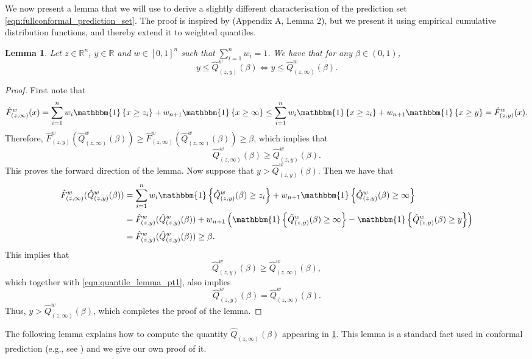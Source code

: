 \documentclass[11pt, titlepage]{article} %
\newcommand{\Ind}[1]{\mathbbm{1}\left\{ #1 \right\}}
\numberwithin{equation}{section}
\newtheorem{lemma}{Lemma}
\theoremstyle{definition}
\numberwithin{theorem}{section}
\numberwithin{lemma}{section}
\numberwithin{corollary}{section}
\numberwithin{proposition}{section}
\numberwithin{definition}{section}
\numberwithin{remark}{section}
\begin{document}
\noindent
We now present a lemma that we will use to derive a slightly different characterisation of the prediction set \eqref{eqn:fullconformal_prediction_set}. The proof is inspired by \cite{romano2019_CQR} (Appendix A, Lemma 2), but we present it using empirical cumulative distribution functions, and thereby extend it to weighted quantiles.

\begin{lemma}
    Let \(z \in \mathbb{R}^n\), \(y \in \mathbb{R}\) and \(w \in [0,1]^n\) such that \(\sum_{i=1}^n w_i = 1\). We have that for any \(\beta \in (0,1)\), \[y \leq \hat{Q}^w_{(z,y)}(\beta) \iff y \leq \hat{Q}^w_{(z,\infty)}(\beta).\]
\label{lemma:quantile_lemma}
\end{lemma}
\begin{proof}
    First note that \[
        \hat{F}^w_{(z,\infty)}(x) = \sum_{i=1}^n w_i \Ind{x \geq z_i} + w_{n+1} \Ind{x \geq \infty} \leq \sum_{i=1}^n w_i \Ind{x \geq z_i} + w_{n+1} \Ind{x \geq y} = \hat{F}^w_{(z,y)}(x).
    \] Therefore, \(\hat{F}^w_{(z,y)}(\hat{Q}^w_{(z, \infty)}(\beta)) \geq \hat{F}^w_{(z,\infty)}(\hat{Q}^w_{(z, \infty)}(\beta)) \geq \beta\), which implies that \begin{equation}
        \hat{Q}^w_{(z, \infty)}(\beta) \geq \hat{Q}^w_{(z, y)}(\beta).
    \label{eqn:quantile_lemma_pt1}
    \end{equation} This proves the forward direction of the lemma. Now suppose that \(y > \hat{Q}^w_{(z,y)}(\beta).\) Then we have that \begin{align*}
        \hat{F}^w_{(z,\infty)}(\hat{Q}^w_{(z, y)}(\beta)) &= \sum_{i=1}^n w_i \Ind{\hat{Q}^w_{(z, y)}(\beta) \geq z_i} + w_{n+1} \Ind{\hat{Q}^w_{(z, y)}(\beta) \geq \infty} \\
        &= \hat{F}^w_{(z,y)}(\hat{Q}^w_{(z, y)}(\beta)) + w_{n+1} \left( \Ind{\hat{Q}^w_{(z, y)}(\beta) \geq \infty} - \Ind{\hat{Q}^w_{(z, y)}(\beta) \geq y} \right) \\
        &= \hat{F}^w_{(z,y)}(\hat{Q}^w_{(z, y)}(\beta)) \geq \beta.
    \end{align*} This implies that \[\hat{Q}^w_{(z, y)}(\beta) \geq \hat{Q}^w_{(z, \infty)}(\beta),\] which together with \eqref{eqn:quantile_lemma_pt1}, also implies \[\hat{Q}^w_{(z, y)}(\beta) = \hat{Q}^w_{(z, \infty)}(\beta).\] Thus, \(y > \hat{Q}^w_{(z, \infty)}(\beta)\), which completes the proof of the lemma.
\end{proof}

\noindent
The following lemma explains how to compute the quantity \(\hat{Q}_{(z, \infty)}(\beta)\) appearing in \cref{lemma:quantile_lemma}. This lemma is a standard fact used in conformal prediction (e.g., see \cite{lei2018}) and we give our own proof of it.
\end{document}
